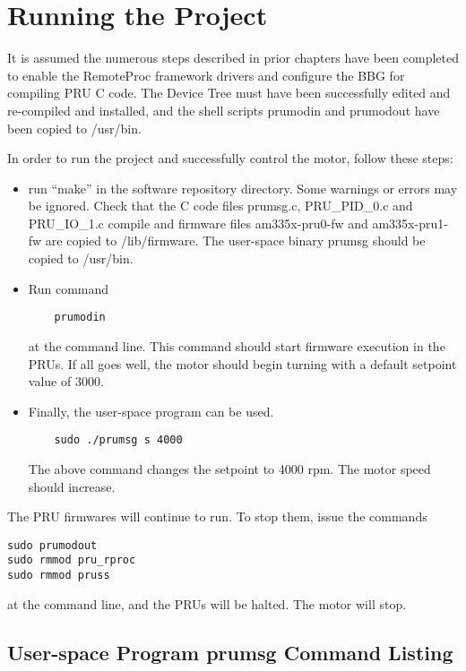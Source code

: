 \chapter{Running the Project}

It is assumed the numerous steps described in prior chapters have been completed to enable the RemoteProc framework drivers and configure the BBG for compiling PRU C code.  The Device Tree must have been successfully edited and re-compiled and installed, and the shell scripts prumodin and prumodout have been copied to /usr/bin.

In order to run the project and successfully control the motor, follow these steps:

\begin{itemize}
	\item run ``make'' in the software repository directory.  Some warnings or errors may be ignored.  Check that the C code files prumsg.c, PRU\_PID\_0.c and PRU\_IO\_1.c compile and firmware files am335x-pru0-fw and am335x-pru1-fw are copied to /lib/firmware.  The user-space binary prumsg should be copied to /usr/bin.
	
	\item Run command 
	
	\begin{verbatim}
	prumodin
	\end{verbatim} 
	
	at the command line.  This command should start firmware execution in the PRUs.
	If all goes well, the motor should begin turning with a default setpoint value of 3000.
	
	\item  Finally, the user-space program can be used.
	
	\begin{verbatim}
	sudo ./prumsg s 4000
	\end{verbatim}
	
	The above command changes the setpoint to 4000 rpm.  The motor speed should increase.
\end{itemize}

The PRU firmwares will continue to run.  To stop them, issue the commands

\begin{verbatim}
sudo prumodout
sudo rmmod pru_rproc
sudo rmmod pruss
\end{verbatim}

at the command line, and the PRUs will be halted.  The motor will stop.

\section{User-space Program prumsg Command Listing}

